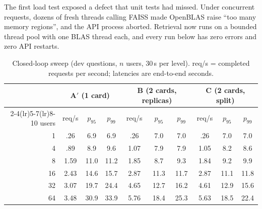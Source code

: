 \documentclass[11pt,a4paper]{article}
\begin{document}
The first load test exposed a defect that unit tests had missed. Under concurrent requests, dozens of fresh threads calling FAISS made OpenBLAS raise ``too many memory regions'', and the API process aborted. Retrieval now runs on a bounded thread pool with one BLAS thread each, and every run below has zero errors and zero API restarts.
\begin{table}[H]
\centering
\caption{Closed-loop sweep (dev questions, $n$ users, $30$\,s per level). req/s = completed requests per second; latencies are end-to-end seconds.}\label{tab:capacity}
\small\setlength{\tabcolsep}{3.5pt}
\begin{tabular}{@{}rccccccccc@{}}
\toprule
 & \multicolumn{3}{c}{A$'$ (1 card)} & \multicolumn{3}{c}{B (2 cards, replicas)} & \multicolumn{3}{c}{C (2 cards, split)}\\
\cmidrule(lr){2-4}\cmidrule(lr){5-7}\cmidrule(lr){8-10}
users & req/s & $p_{95}$ & $p_{99}$ & req/s & $p_{95}$ & $p_{99}$ & req/s & $p_{95}$ & $p_{99}$\\
\midrule
1 & .26 & 6.9 & 6.9 & .26 & 7.0 & 7.0 & .26 & 7.0 & 7.0\\
4 & .89 & 8.9 & 9.6 & 1.07 & 7.9 & 7.9 & 1.05 & 8.2 & 8.6\\
8 & 1.59 & 11.0 & 11.2 & 1.85 & 8.7 & 9.3 & 1.84 & 9.2 & 9.9\\
16 & 2.43 & 14.6 & 15.7 & 2.87 & 11.3 & 11.7 & 2.87 & 11.1 & 11.8\\
32 & 3.07 & 19.7 & 24.4 & 4.65 & 12.7 & 16.2 & 4.61 & 12.9 & 15.6\\
64 & 3.48 & 30.9 & 33.9 & 5.76 & 18.4 & 25.3 & 5.63 & 18.5 & 22.4\\
\bottomrule
\end{tabular}
\end{table}
\end{document}
